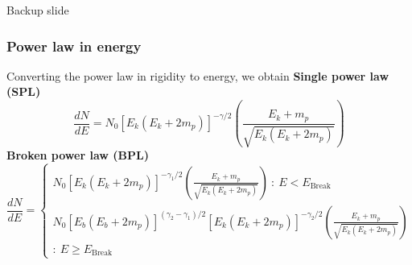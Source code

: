 \documentclass{beamer}
\begin{document}

\begin{frame}
\Huge{\centerline{Backup slide}}
\end{frame}

\begin{frame}
\frametitle{Power law in energy}
Converting the power law in rigidity to energy, we obtain
\textbf{Single power law (SPL)}
\begin{equation}
\frac{dN}{dE} = N_0[E_k(E_k+2m_p)]^{-\gamma/2} \left(\frac{E_k+m_p}{\sqrt{E_k(E_k+2m_p)}}\right)
\end{equation}
\textbf{Broken power law (BPL)}
\begin{equation}
\frac{dN}{dE}=
  \begin{cases}
    N_0[E_k(E_k+2m_p)]^{-\gamma_1/2} \left(\frac{E_k+m_p}{\sqrt{E_k(E_k+2m_p)}}\right)\ :\ E < E_{\text{Break}}\\
    N_0[E_b(E_b+2m_p)]^{(\gamma_2-\gamma_1)/2}[E_k(E_k+2m_p)]^{-\gamma_2/2} \left(\frac{E_k+m_p}{\sqrt{E_k(E_k+2m_p)}}\right)\\ :\ E \ge E_{\text{Break}}
  \end{cases}
\end{equation}
\end{frame}
\end{document}

